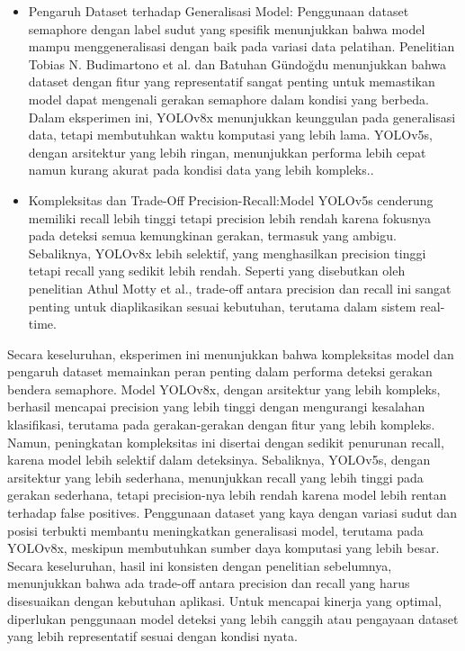 \documentclass[12pt,a4paper]{article}
\begin{document}
\begin{adjustwidth}{3em}{0pt}
\begin{itemize}
    \item Pengaruh Dataset terhadap Generalisasi Model: Penggunaan dataset semaphore dengan label sudut yang spesifik menunjukkan bahwa model mampu menggeneralisasi dengan baik pada variasi data pelatihan. Penelitian Tobias N. Budimartono et al. dan Batuhan Gündoğdu menunjukkan bahwa dataset dengan fitur yang representatif sangat penting untuk memastikan model dapat mengenali gerakan semaphore dalam kondisi yang berbeda. Dalam eksperimen ini, YOLOv8x menunjukkan keunggulan pada generalisasi data, tetapi membutuhkan waktu komputasi yang lebih lama. YOLOv5s, dengan arsitektur yang lebih ringan, menunjukkan performa lebih cepat namun kurang akurat pada kondisi data yang lebih kompleks..

    \item Kompleksitas dan Trade-Off Precision-Recall:Model YOLOv5s cenderung memiliki recall lebih tinggi tetapi precision lebih rendah karena fokusnya pada deteksi semua kemungkinan gerakan, termasuk yang ambigu. Sebaliknya, YOLOv8x lebih selektif, yang menghasilkan precision tinggi tetapi recall yang sedikit lebih rendah. Seperti yang disebutkan oleh penelitian Athul Motty et al., trade-off antara precision dan recall ini sangat penting untuk diaplikasikan sesuai kebutuhan, terutama dalam sistem real-time. 
    \end{itemize}

\hspace{0.5cm} Secara keseluruhan, eksperimen ini menunjukkan bahwa kompleksitas model dan pengaruh dataset memainkan peran penting dalam performa deteksi gerakan bendera semaphore. Model YOLOv8x, dengan arsitektur yang lebih kompleks, berhasil mencapai precision yang lebih tinggi dengan mengurangi kesalahan klasifikasi, terutama pada gerakan-gerakan dengan fitur yang lebih kompleks. Namun, peningkatan kompleksitas ini disertai dengan sedikit penurunan recall, karena model lebih selektif dalam deteksinya. Sebaliknya, YOLOv5s, dengan arsitektur yang lebih sederhana, menunjukkan recall yang lebih tinggi pada gerakan sederhana, tetapi precision-nya lebih rendah karena model lebih rentan terhadap false positives. Penggunaan dataset yang kaya dengan variasi sudut dan posisi terbukti membantu meningkatkan generalisasi model, terutama pada YOLOv8x, meskipun membutuhkan sumber daya komputasi yang lebih besar. Secara keseluruhan, hasil ini konsisten dengan penelitian sebelumnya, menunjukkan bahwa ada trade-off antara precision dan recall yang harus disesuaikan dengan kebutuhan aplikasi. Untuk mencapai kinerja yang optimal, diperlukan penggunaan model deteksi yang lebih canggih atau pengayaan dataset yang lebih representatif sesuai dengan kondisi nyata.

\end{adjustwidth}
\end{document}
